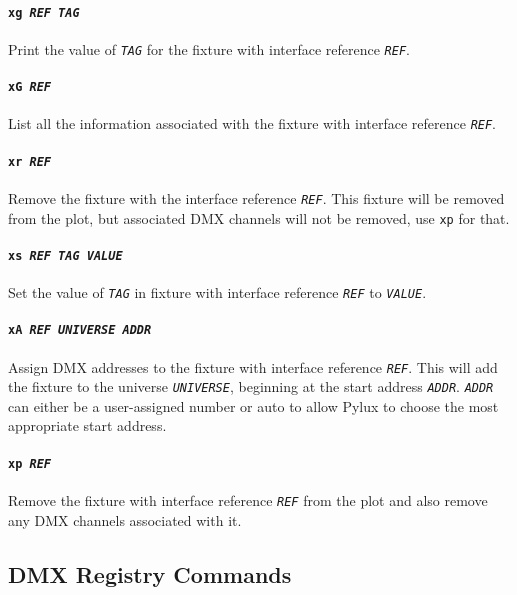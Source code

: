 \documentclass[a4paper]{article}
\begin{document}
\paragraph{\texttt{xg \textit{REF TAG}}}
Print the value of \texttt{\textit{TAG}} for the fixture with interface
reference \texttt{\textit{REF}}.

\paragraph{\texttt{xG \textit{REF}}}
List all the information associated with the fixture with interface reference 
\texttt{\textit{REF}}.

\paragraph{\texttt{xr \textit{REF}}}
Remove the fixture with the interface reference \texttt{\textit{REF}}. This 
fixture will be removed from the plot, but associated DMX channels will not be 
removed, use \texttt{xp} for that.

\paragraph{\texttt{xs \textit{REF TAG VALUE}}}
Set the value of \texttt{\textit{TAG}} in fixture with interface reference 
\texttt{\textit{REF}} to \texttt{\textit{VALUE}}.

\paragraph{\texttt{xA \textit{REF UNIVERSE ADDR}}}
Assign DMX addresses to the fixture with interface reference 
\texttt{\textit{REF}}. This will add the fixture to the universe 
\texttt{\textit{UNIVERSE}}, beginning at the start address 
\texttt{\textit{ADDR}}. \texttt{\textit{ADDR}} can either be a user-assigned 
number or auto to allow Pylux to choose the most appropriate start address.

\paragraph{\texttt{xp \textit{REF}}}
Remove the fixture with interface reference \texttt{\textit{REF}} from the 
plot and also remove any DMX channels associated with it.

\subsection{DMX Registry Commands}
\end{document}
